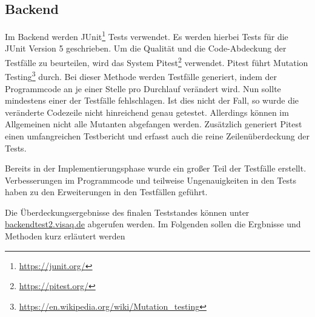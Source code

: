 \subsection{Backend}
Im Backend werden JUnit\footnote{\url{https://junit.org/}} Tests verwendet. Es werden hierbei Tests für die JUnit Version 5 geschrieben.
Um die Qualität und die Code-Abdeckung der Testfälle zu beurteilen, wird das System Pitest\footnote{\url{https://pitest.org/}} verwendet.
Pitest führt Mutation Testing\footnote{\url{https://en.wikipedia.org/wiki/Mutation_testing}} durch.
Bei dieser Methode werden Testfälle generiert, indem der Programmcode an je einer Stelle pro Durchlauf verändert wird.
Nun sollte mindestens einer der Testfälle fehlschlagen.
Ist dies nicht der Fall, so wurde die veränderte Codezeile nicht hinreichend genau getestet.
Allerdings können im Allgemeinen nicht alle Mutanten abgefangen werden.
Zusätzlich generiert Pitest einen umfangreichen Testbericht und erfasst auch die reine Zeilenüberdeckung der Tests.

Bereits in der Implementierungsphase wurde ein großer Teil der Testfälle erstellt.
Verbesserungen im Programmcode und teilweise Ungenauigkeiten in den Tests haben zu den Erweiterungen in den Testfällen geführt.

Die Überdeckungsergebnisse des finalen Teststandes können unter \url{backendtest2.visaq.de} abgerufen werden.
Im Folgenden sollen die Ergbnisse und Methoden kurz erläutert werden


